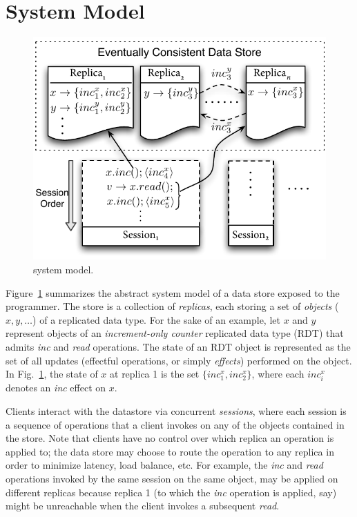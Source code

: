 \section{System Model}
\label{sec:sysmod}

\begin{figure}
\centering
\includegraphics[scale=0.9]{Figures/SystemModel}
\caption{\name system model.}
\label{fig:sysmod}
\end{figure}

Figure~\ref{fig:sysmod} summarizes the abstract system model of a data
store exposed to the \name programmer. The store is a collection of
\emph{replicas}, each storing a set of \emph{objects} ($x,y,\ldots$)
of a replicated data type. For the sake of an example,  let $x$ and
$y$ represent objects of an \emph{increment-only counter} replicated
data type (RDT) that admits \emph{inc} and \emph{read} operations. The
state of an RDT object is represented as the set of all updates
(effectful operations, or simply \emph{effects}) performed on the
object. In Fig.~\ref{fig:sysmod}, the state of $x$ at replica 1 is the
set $\{inc^x_1,inc^x_2\}$, where each $inc^x_i$ denotes an \emph{inc}
effect on $x$.

Clients interact with the datastore via concurrent \emph{sessions},
where each session is a sequence of operations that a client invokes
on any of the objects contained in the store. Note that clients have
no control over which replica an operation is applied to; the data
store may choose to route the operation to any replica in order to
minimize latency, load balance, etc. For example, the \emph{inc} and
\emph{read} operations invoked by the same session on the same object,
may be applied on different replicas because replica 1 (to which the
\emph{inc} operation is applied, say) might be unreachable when the
client invokes a subsequent \emph{read}.

